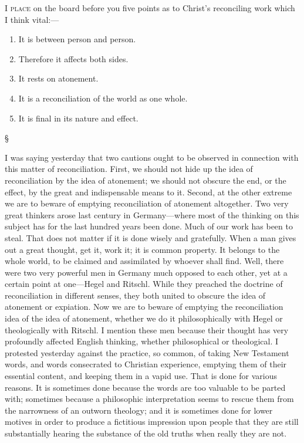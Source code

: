 \documentclass[12pt,letterpaper,oneside]{book}
\begin{document}









\textsc{I place} on the board before you five points 
as to Christ's reconciling work which I 
think vital:--- 

\begin{enumerate}
\item It is between person and person.
\item Therefore it affects both sides. 
\item It rests on atonement. 
\item It is a reconciliation of the world as 
one whole. 
\item It is final in its nature and effect.
\end{enumerate}

\begin{center}
\S
\end{center}

I was saying yesterday that two cautions 
ought to be observed in connection with this 
matter of reconciliation. First, we should not 
hide up the idea of reconciliation by the idea of 
atonement; we should not obscure the end, or 
the effect, by the great and indispensable means 
to it. Second, at the other extreme we are to 
beware of emptying reconciliation of atonement 
altogether. Two very great thinkers arose last 
century in Germany---where most of the thinking 
on this subject has for the last hundred years 
been done. Much of our work has been to steal. 
That does not matter if it is done wisely and 
gratefully. When a man gives out a great 
thought, get it, work it; it is common property. 
It belongs to the whole world, to be claimed and 
assimilated by whoever shall find. Well, there 
were two very powerful men in Germany much 
opposed to each other, yet at a certain point at 
one---Hegel and Ritschl. While they preached 
the doctrine of reconciliation in different senses, 
they both united to obscure the idea of atonement 
or expiation. Now we are to beware of 
emptying the reconciliation idea of the idea 
of atonement, whether we do it philosophically 
with Hegel or theologically with Ritschl. I 
mention these men because their thought has 
very profoundly affected English thinking, 
whether philosophical or theological. I protested 
yesterday against the practice, so common, 
of taking New Testament words, and 
words consecrated to Christian experience, 
emptying them of their essential content, and 
keeping them in a vapid use. That is done for 
various reasons. It is sometimes done because 
the words are too valuable to be parted with; 
sometimes because a philosophic interpretation 
seems to rescue them from the narrowness of 
an outworn theology; and it is sometimes done 
for lower motives in order to produce a fictitious 
impression upon people that they are still substantially 
hearing the substance of the old truths 
when really they are not. 
\end{document}
